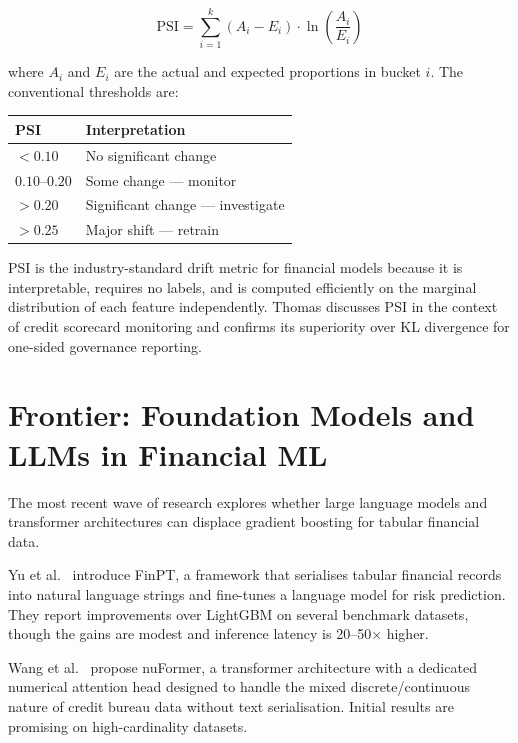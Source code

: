 \documentclass[12pt, a4paper]{article}
\begin{document}
\begin{equation}
    \text{PSI} = \sum_{i=1}^{k} \left( A_i - E_i \right) \cdot \ln\!\left(\frac{A_i}{E_i}\right)
\end{equation}

where $A_i$ and $E_i$ are the actual and expected proportions in bucket $i$.
The conventional thresholds are:

\begin{center}
\begin{tabular}{ll}
\toprule
PSI & Interpretation \\
\midrule
$< 0.10$ & No significant change \\
$0.10$--$0.20$ & Some change --- monitor \\
$> 0.20$ & Significant change --- investigate \\
$> 0.25$ & Major shift --- retrain \\
\bottomrule
\end{tabular}
\end{center}

PSI is the industry-standard drift metric for financial models because it is
interpretable, requires no labels, and is computed efficiently on the marginal
distribution of each feature independently.
Thomas \cite{thomas2009} discusses PSI in the context of credit scorecard monitoring
and confirms its superiority over KL divergence for one-sided governance reporting.

\section{Frontier: Foundation Models and LLMs in Financial ML}

The most recent wave of research explores whether large language models and
transformer architectures can displace gradient boosting for tabular financial data.

Yu et al.\ \cite{yu2023} introduce FinPT, a framework that serialises tabular
financial records into natural language strings and fine-tunes a language model
for risk prediction.
They report improvements over LightGBM on several benchmark datasets, though the
gains are modest and inference latency is 20--50× higher.

Wang et al.\ \cite{wang2023} propose nuFormer, a transformer architecture with a
dedicated numerical attention head designed to handle the mixed discrete/continuous
nature of credit bureau data without text serialisation.
Initial results are promising on high-cardinality datasets.
\end{document}
